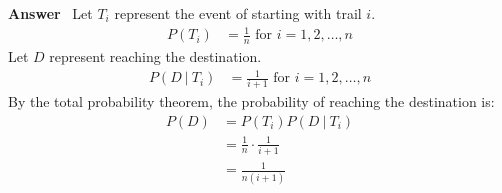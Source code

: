 \documentclass[paper=usletter, fontsize=12pt]{article}
\newcommand{\ans}{\textbf{Answer} \ }
\newcommand\given[1][]{\:#1\vert\:}
\begin{document}
\begin{enumerate}
        \ans Let $T_i$ represent the event of starting with trail $i$.
        \begin{align*}
            P(T_i) & = \frac{1}{n} \text{ \ for \ } i = 1, 2, \ldots, n
        \end{align*}
        Let $D$ represent reaching the destination.
        \begin{align*}
            P(D \given T_i) & = \frac{1}{i+1} \text{ \ for \ } i = 1, 2,
            \ldots, n
        \end{align*}
        By the total probability theorem, the probability of reaching the
        destination is:
        \begin{align*}
            P(D) & = P(T_i)P(D \given T_i) \\
            & = \frac{1}{n} \cdot \frac{1}{i+1} \\
            & = \frac{1}{n(i+1)}
        \end{align*}


    \end{enumerate}
\end{document}
